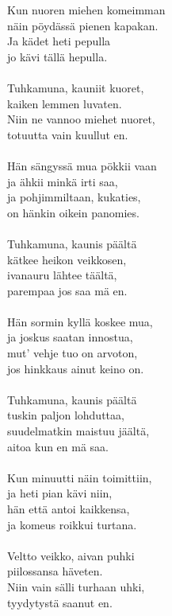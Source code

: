 
            Kun nuoren miehen komeimman  \\
            näin pöydässä pienen kapakan.  \\
            Ja kädet heti pepulla  \\
            jo kävi tällä hepulla. \\
\hspace{10mm} \\
            Tuhkamuna, kauniit kuoret,  \\
            kaiken lemmen luvaten.  \\
            Niin ne vannoo miehet nuoret,  \\
            totuutta vain kuullut en. \\
\hspace{10mm} \\
            Hän sängyssä mua pökkii vaan  \\
            ja ähkii minkä irti saa,  \\
            ja pohjimmiltaan, kukaties,  \\
            on hänkin oikein panomies. \\
\hspace{10mm} \\
            Tuhkamuna, kaunis päältä  \\
            kätkee heikon veikkosen,  \\
            ivanauru lähtee täältä,  \\
            parempaa jos saa mä en. \\
\hspace{10mm} \\
            Hän sormin kyllä koskee mua,  \\
            ja joskus saatan innostua,  \\
            mut' vehje tuo on arvoton,  \\
            jos hinkkaus ainut keino on. \\
\hspace{10mm} \\
            Tuhkamuna, kaunis päältä  \\
            tuskin paljon lohduttaa,  \\
            suudelmatkin maistuu jäältä,  \\
            aitoa kun en mä saa. \\
\hspace{10mm} \\
            Kun minuutti näin toimittiin, \\
            ja heti pian kävi niin, \\
            hän että antoi kaikkensa, \\
            ja komeus roikkui turtana. \\
\hspace{10mm} \\
            Veltto veikko, aivan puhki \\
            piilossansa häveten. \\
            Niin vain sälli turhaan uhki, \\
            tyydytystä saanut en. \\
